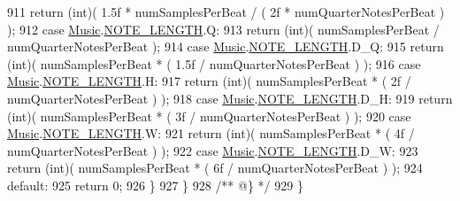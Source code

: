 \begin{DoxyCodeInclude}
911                 \textcolor{keywordflow}{return} (\textcolor{keywordtype}{int})( 1.5f * numSamplesPerBeat / ( 2f * numQuarterNotesPerBeat ) );
912             \textcolor{keywordflow}{case} \hyperlink{class_music}{Music}.\hyperlink{group___music_enums_gaf11b5f079adbb21c800b9eca1c5c3cbd}{NOTE\_LENGTH}.Q:
913                 \textcolor{keywordflow}{return} (\textcolor{keywordtype}{int})( numSamplesPerBeat / numQuarterNotesPerBeat );
914             \textcolor{keywordflow}{case} \hyperlink{class_music}{Music}.\hyperlink{group___music_enums_gaf11b5f079adbb21c800b9eca1c5c3cbd}{NOTE\_LENGTH}.D\_Q:
915                 \textcolor{keywordflow}{return} (\textcolor{keywordtype}{int})( numSamplesPerBeat * ( 1.5f / numQuarterNotesPerBeat ) );
916             \textcolor{keywordflow}{case} \hyperlink{class_music}{Music}.\hyperlink{group___music_enums_gaf11b5f079adbb21c800b9eca1c5c3cbd}{NOTE\_LENGTH}.H:
917                 \textcolor{keywordflow}{return} (\textcolor{keywordtype}{int})( numSamplesPerBeat * ( 2f / numQuarterNotesPerBeat ) );
918             \textcolor{keywordflow}{case} \hyperlink{class_music}{Music}.\hyperlink{group___music_enums_gaf11b5f079adbb21c800b9eca1c5c3cbd}{NOTE\_LENGTH}.D\_H:
919                 \textcolor{keywordflow}{return} (\textcolor{keywordtype}{int})( numSamplesPerBeat * ( 3f / numQuarterNotesPerBeat ) );
920             \textcolor{keywordflow}{case} \hyperlink{class_music}{Music}.\hyperlink{group___music_enums_gaf11b5f079adbb21c800b9eca1c5c3cbd}{NOTE\_LENGTH}.W:
921                 \textcolor{keywordflow}{return} (\textcolor{keywordtype}{int})( numSamplesPerBeat * ( 4f / numQuarterNotesPerBeat ) );
922             \textcolor{keywordflow}{case} \hyperlink{class_music}{Music}.\hyperlink{group___music_enums_gaf11b5f079adbb21c800b9eca1c5c3cbd}{NOTE\_LENGTH}.D\_W:
923                 \textcolor{keywordflow}{return} (\textcolor{keywordtype}{int})( numSamplesPerBeat * ( 6f / numQuarterNotesPerBeat ) );
924             \textcolor{keywordflow}{default}:
925                 \textcolor{keywordflow}{return} 0;
926         \}
927     \}\textcolor{comment}{}
928 \textcolor{comment}{    /** @\} */}
929 \}
\end{DoxyCodeInclude}
 